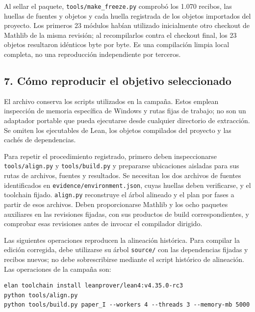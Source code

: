 \documentclass[spanish,11pt,a4paper]{article}
\begin{document}
Al sellar el paquete, \texttt{tools/\allowbreak{}make\_\allowbreak{}freeze.\allowbreak{}py} comprobó los 1.070 recibos, las huellas de fuentes y objetos y cada huella registrada de los objetos importados del proyecto. Los primeros 23 módulos habían utilizado inicialmente otro checkout de Mathlib de la misma revisión; al recompilarlos contra el checkout final, los 23 objetos resultaron idénticos byte por byte. Es una compilación limpia local completa, no una reproducción independiente por terceros.

\subsection{7. Cómo reproducir el objetivo seleccionado}\label{cuxf3mo-reproducir-el-objetivo-seleccionado}

El archivo conserva los scripts utilizados en la campaña. Estos emplean inspección de memoria específica de Windows y rutas fijas de trabajo; no son un adaptador portable que pueda ejecutarse desde cualquier directorio de extracción. Se omiten los ejecutables de Lean, los objetos compilados del proyecto y las cachés de dependencias.

Para repetir el procedimiento registrado, primero deben inspeccionarse \texttt{tools/\allowbreak{}align.\allowbreak{}py} y \texttt{tools/\allowbreak{}build.\allowbreak{}py} y prepararse ubicaciones aisladas para sus rutas de archivos, fuentes y resultados. Se necesitan los dos archivos de fuentes identificados en \texttt{evidence/\allowbreak{}environment.\allowbreak{}json}, cuyas huellas deben verificarse, y el toolchain fijado. \texttt{align.\allowbreak{}py} reconstruye el árbol alineado y el plan por fases a partir de esos archivos. Deben proporcionarse Mathlib y los ocho paquetes auxiliares en las revisiones fijadas, con sus productos de build correspondientes, y comprobar esas revisiones antes de invocar el compilador dirigido.

Las siguientes operaciones reproducen la alineación histórica. Para compilar la edición corregida, debe utilizarse su árbol \texttt{source/\allowbreak{}} con las dependencias fijadas y recibos nuevos; no debe sobrescribirse mediante el script histórico de alineación. Las operaciones de la campaña son:

\begin{verbatim}
elan toolchain install leanprover/lean4:v4.35.0-rc3
python tools/align.py
python tools/build.py paper_I --workers 4 --threads 3 --memory-mb 5000
\end{verbatim}
\end{document}
